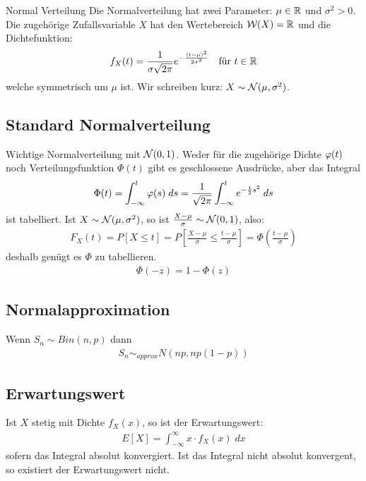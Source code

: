 \begin{definition}{Normal Verteilung}
  Die Normalverteilung hat zwei Parameter: $\mu \in \mathbb{R}$ und $\sigma^2 > 0$. Die
zugehörige Zufallsvariable $X$ hat den Wertebereich $\mathcal{W} (X) = \mathbb{R}$ und die
Dichtefunktion:
\begin{align*}
  f_X (t) = \frac{1}{\sigma \sqrt{2 \pi}} e^{- \frac{{(t - \mu)}^2}{2 \sigma^2}}
   &  & \text{für } t \in \mathbb{R}
\end{align*}
welche symmetrisch um $\mu$ ist. Wir schreiben kurz: $X \sim \mathcal{N} (\mu, \sigma^2)$.
\end{definition}

\subsection{Standard Normalverteilung}
Wichtige Normalverteilung mit $\mathcal{N} (0, 1)$. Weder für die
zugehörige Dichte $\varphi (t)$ noch Verteilungsfunktion $\Phi (t)$ gibt es
geschlossene Ausdrücke, aber das Integral
\begin{align*}
  \Phi (t) = \int_{-\infty}^t \varphi (s) \; ds =
  \frac{1}{\sqrt{2\pi}} \int_{-\infty}^t e^{-\frac{1}{2} s^2} \; ds
\end{align*}
ist tabelliert. Ist $X \sim \mathcal{N} (\mu, \sigma^2)$, so ist
$\frac{X - \mu}{\sigma} \sim \mathcal{N} (0, 1)$, also:
\begin{align*}
  F_X (t) = P[X \leq t] = P \left[ \frac{X-\mu}{\sigma} \leq \frac{t - \mu}{\sigma} \right] = \Phi \left  ( \frac{t - \mu}{\sigma} \right)
\end{align*}
deshalb genügt es $\Phi$ zu tabellieren.
\begin{align*}
  \Phi (-z) = 1 - \Phi (z)
\end{align*}
\subsection{Normalapproximation}
Wenn $S_n \sim Bin (n, p)$ dann
\begin{align*}
  S_n \sim_{approx} N (np, np (1-p))
\end{align*}
\subsection{Erwartungswert}
Ist $X$ stetig mit Dichte $f_X (x)$, so ist der Erwartungswert:
\begin{align*}
  E[X] = \int_{-\infty}^\infty x \cdot f_X (x) \; dx
\end{align*}
sofern das Integral absolut konvergiert. Ist das Integral nicht
absolut konvergent, so existiert der Erwartungswert nicht.
